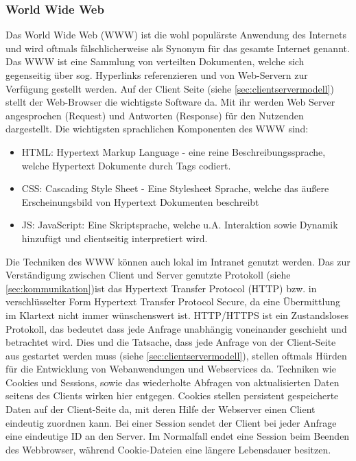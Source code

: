 \subsubsection{World Wide Web}\label{sec:www}
Das World Wide Web (WWW) ist die wohl populärste Anwendung des Internets \cite{safran2011webtechnologien:article} und wird oftmals fälschlicherweise als Synonym für das gesamte Internet genannt. Das WWW ist eine Sammlung von verteilten Dokumenten, welche sich gegenseitig über sog. Hyperlinks referenzieren und von Web-Servern zur Verfügung gestellt werden. Auf der Client Seite (siehe \ref{sec:clientservermodell}) stellt der Web-Browser die wichtigste Software da. Mit ihr werden Web Server angesprochen (Request) und Antworten (Response) für den Nutzenden dargestellt. Die wichtigsten sprachlichen Komponenten des WWW sind: \\ 
\begin{itemize}
	\item HTML: Hypertext Markup Language - eine reine Beschreibungssprache, welche Hypertext Dokumente durch Tags codiert. 
	\item CSS: Cascading Style Sheet - Eine Stylesheet Sprache, welche das äußere Erscheinungsbild von Hypertext Dokumenten beschreibt
	\item JS: JavaScript: Eine Skriptsprache, welche u.A. Interaktion sowie Dynamik hinzufügt und clientseitig interpretiert wird. 
\end{itemize}
Die Techniken des WWW können auch lokal im Intranet genutzt werden. 
Das zur Verständigung zwischen Client und Server genutzte Protokoll (siehe \ref{sec:kommunikation})ist das Hypertext Transfer Protocol (HTTP) bzw. in verschlüsselter Form Hypertext Transfer Protocol Secure, da eine Übermittlung im Klartext nicht immer wünschenswert ist. HTTP/HTTPS ist ein Zustandsloses Protokoll, das bedeutet dass jede Anfrage unabhängig voneinander geschieht und betrachtet wird. Dies und die Tatsache, dass jede Anfrage von der Client-Seite aus gestartet werden muss (siehe \ref{sec:clientservermodell}), stellen oftmals Hürden für die Entwicklung von Webanwendungen und Webservices da. Techniken wie Cookies und Sessions, sowie das wiederholte Abfragen von aktualisierten Daten seitens des Clients wirken hier entgegen. Cookies stellen persistent gespeicherte Daten auf der Client-Seite da, mit deren Hilfe der Webserver einen Client eindeutig zuordnen kann. Bei einer Session sendet der Client bei jeder Anfrage eine eindeutige ID an den Server. Im Normalfall endet eine Session beim Beenden des Webbrowser, während Cookie-Dateien eine längere Lebensdauer besitzen.      
%
